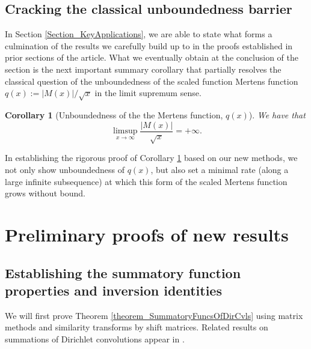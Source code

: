 \documentclass[11pt,reqno,a4letter]{article}
\numberwithin{figure}{section}
\numberwithin{table}{section}
\newcommand{\cf}{\textit{cf.\ }}
\theoremstyle{plain}
\newtheorem{cor}[theorem]{Corollary}
\numberwithin{theorem}{section}
\theoremstyle{definition}
\begin{document}
\subsection{Cracking the classical unboundedness barrier} 

In Section \ref{Section_KeyApplications}, 
we are able to state what forms a culmination of the results 
we carefully build up to in the proofs established in prior sections of the article. 
What we eventually obtain at the conclusion of the section 
is the next important summary corollary that partially 
resolves the classical question of the 
unboundedness of the scaled function Mertens function 
$q(x) := |M(x)| / \sqrt{x}$ in the limit supremum sense. 

\begin{cor}[Unboundedness of the the Mertens function, $q(x)$] 
\label{cor_ThePipeDreamResult_v1} 
We have that 
\[
\limsup_{x \rightarrow \infty} \frac{|M(x)|}{\sqrt{x}} = +\infty. 
\]
\end{cor} 

In establishing the rigorous proof of 
Corollary \ref{cor_ThePipeDreamResult_v1} 
based on our new methods, we not only show unboundedness of 
$q(x)$, but also set a minimal rate (along a large infinite subsequence) 
at which this form of the 
scaled Mertens function grows without bound. 

\newpage 
\section{Preliminary proofs of new results} 
\label{Section_PrelimProofs_Config} 

\subsection{Establishing the summatory function properties and inversion identities} 

We will first prove Theorem \ref{theorem_SummatoryFuncsOfDirCvls} 
using matrix methods and similarity transforms by shift matrices. 
Related results on summations of Dirichlet convolutions appear in 
\cite[\S 2.14; \S 3.10; \S 3.12; \cf \S 4.9, p.\ 95]{APOSTOLANUMT}. 
\end{document}
